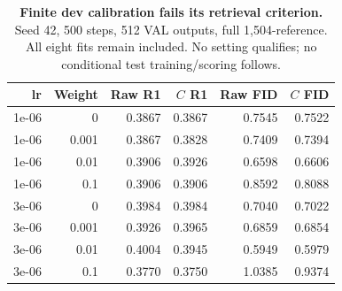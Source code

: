 \begin{table}[t]
\centering\footnotesize
\caption{\textbf{Finite dev calibration fails its retrieval criterion.} Seed 42, 500 steps, 512 VAL outputs, full 1,504-reference. All eight fits remain included. No setting qualifies; no conditional test training/scoring follows.}\label{tab:rewarddevgrid}
\begin{tabular}{@{}rrrrrr@{}}\toprule
lr&Weight&Raw R1&$C$ R1&Raw FID&$C$ FID\\\midrule
1e-06&0&0.3867&0.3867&0.7545&0.7522\\
1e-06&0.001&0.3867&0.3828&0.7409&0.7394\\
1e-06&0.01&0.3906&0.3926&0.6598&0.6606\\
1e-06&0.1&0.3906&0.3906&0.8592&0.8088\\
3e-06&0&0.3984&0.3984&0.7040&0.7022\\
3e-06&0.001&0.3926&0.3965&0.6859&0.6854\\
3e-06&0.01&0.4004&0.3945&0.5949&0.5979\\
3e-06&0.1&0.3770&0.3750&1.0385&0.9374\\
\bottomrule\end{tabular}\end{table}
